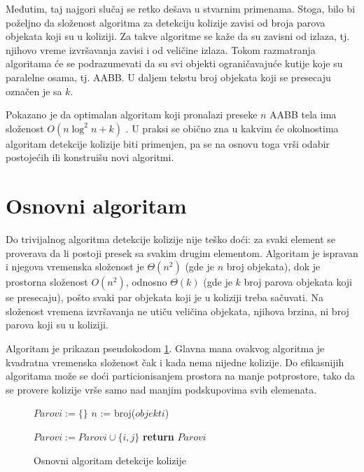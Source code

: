 \documentclass[12pt,oneside]{memoir}
\begin{document}
Međutim, taj najgori slučaj se retko dešava u stvarnim primenama. 
Stoga, bilo bi poželjno da složenost algoritma za detekciju kolizije zavisi od broja parova objekata koji su u koliziji.
Za takve algoritme se kaže da su zavisni od izlaza, tj. njihovo vreme izvršavanja zavisi i od veličine izlaza. 
Tokom razmatranja algoritama će se podrazumevati da su svi objekti ograničavajuće kutije koje su paralelne osama,
tj. AABB. U daljem tekstu broj objekata koji se presecaju označen je sa $k$.

Pokazano je da optimalan algoritam koji pronalazi preseke $n$ AABB tela ima složenost 
$O(n \log^2 n + k)$ \cite{glavna1}. 
U praksi se obično zna u kakvim će okolnostima algoritam detekcije kolizije biti primenjen, pa 
se na osnovu toga vrši odabir postojećih ili konstruišu novi algoritmi.

\section{Osnovni algoritam}
\label{subsec:triv}

Do trivijalnog algoritma detekcije kolizije nije teško doći: za svaki element se proverava da li postoji presek sa svakim drugim elementom.
Algoritam je ispravan i njegova vremenska složenost je $\Theta (n^2) $ (gde je $n$ broj objekata), dok je prostorna složenost
$O(n^2)$, odnosno $\Theta(k)$ (gde je $k$ broj parova objekata koji se presecaju), pošto svaki par objekata koji je u koliziji treba sačuvati.
Na složenost vremena izvršavanja ne utiču veličina objekata, njihova brzina, ni broj parova koji su u koliziji.

Algoritam je prikazan pseudokodom \ref{alg:triv}.
Glavna mana ovakvog algoritma je kvadratna vremenska složenost čak i kada nema nijedne kolizije.
Do efikasnijih algoritama može se doći particionisanjem prostora na manje potprostore, tako da
se provere kolizije vrše samo nad manjim podskupovima svih elemenata.

\begin{figure}[!h]
    \label{alg:triv}
	\begin{algorithmic}[1]
		\State $Parovi := \{ \}$
		\State $n$ := broj($objekti$)

				\State $Parovi:=Parovi \cup \{i, j\}$
			\EndIf		
		\EndFor
		\EndFor
		\State \textbf{return} $Parovi$
		\EndProcedure
    \end{algorithmic}
\caption{Osnovni algoritam detekcije kolizije}
\end{figure}
\end{document}
